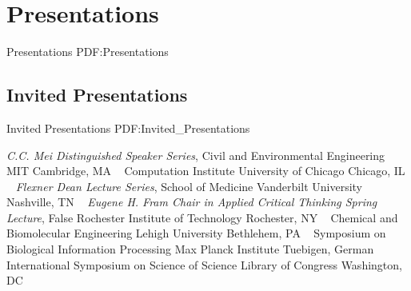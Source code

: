 \section
{Presentations}
{Presentations}
{PDF:Presentations}

\subsection
{Invited Presentations}
{Invited Presentations}
{PDF:Invited_Presentations}

\GapNoBreak
{}
\textit{C.C. Mei Distinguished Speaker Series}, Civil and Environmental Engineering
\newline
    MIT
    \newline
Cambridge, MA
\newline
~
\Gap
{}
Computation Institute
\newline
    University of Chicago
    \newline
Chicago, IL
\newline
~
\Gap
{}
\textit{Flexner Dean Lecture Series}, School of Medicine
\newline
    Vanderbilt University
    \newline
Nashville, TN
\newline
~
\Gap
{}
\textit{Eugene H. Fram Chair in Applied Critical Thinking Spring Lecture}, False
\newline
    Rochester Institute of Technology
    \newline
Rochester, NY
\newline
~
\Gap
{}
Chemical and Biomolecular Engineering
\newline
    Lehigh University
    \newline
Bethlehem, PA
\newline
~
\Gap
{}
Symposium on Biological Information Processing
\newline
    Max Planck Institute
    \newline
Tuebigen, German
\newline
~
\Gap
{}
International Symposium on Science of Science
\newline
    Library of Congress
    \newline
Washington, DC
\newline
